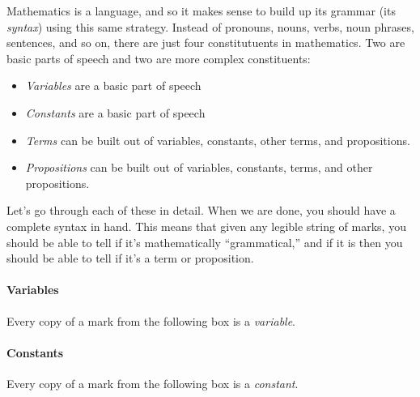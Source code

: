 \documentclass[12pt]{article}
\def\N{\mathbb{N}}
\def\R{\mathbb{R}}
\renewcommand{\emptyset}{\{\hspace{-2pt}\}}
\begin{document}
Mathematics is a language, and so it makes sense to build up its grammar (its \emph{syntax}) using this same strategy.
Instead of pronouns, nouns, verbs, noun phrases, sentences, and so on, there are just four constitutuents in
mathematics. Two are basic parts of speech and two are more complex constituents:
\begin{itemize}
\item \emph{Variables} are a basic part of speech
\item \emph{Constants} are a basic part of speech
\item \emph{Terms} can be built out of variables, constants, other terms, and propositions.
\item \emph{Propositions} can be built out of variables, constants, terms, and other propositions.
\end{itemize}

Let's go through each of these in detail.
When we are done, you should have a complete syntax in hand.
This means that given any legible string of marks, you should be able to tell
if it's mathematically ``grammatical,'' and if it is then you should be able to tell
if it's a term or proposition.


\paragraph{Variables}
Every copy of a mark from the following box is a \emph{variable}.
\begin{center}
\end{center}



\def\sp{\hspace{1em}}
\paragraph{Constants}
Every copy of a mark from the following box is a \emph{constant}.
\begin{center}
\fbox{
\parbox{30em}{
$0$ \sp $1$ \sp $2$ \sp $3$ \sp $4$ \sp $5$ \sp $6$ \sp $7$ \sp $8$ \sp $9$ \sp $\N$ \sp $\R$ \sp $\emptyset$
}
}
\end{center}


\def\sp{\hspace{1em}}
\end{document}
